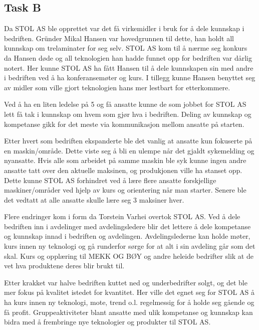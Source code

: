 \subsection{Task B}
Da STOL AS ble opprettet var det få virkemidler i bruk for å dele kunnskap i bedriften. 
Gründer Mikal Hansen var hovedgrunnen til dette, han holdt all kunnskap om trelaminater for seg selv. STOL AS kom til å nærme seg konkurs da Hansen døde og all teknologien han hadde funnet opp for bedriften var dårlig notert. 
Her kunne STOL AS ha fått Hansen til å dele kunnskapen sin med andre i bedriften ved å ha konferansemøter og kurs. I tillegg kunne Hansen benyttet seg av midler som ville gjort teknologien hans mer lestbart for etterkommere.

Ved å ha en liten ledelse på 5 og få ansatte kunne de som jobbet for STOL AS lett få tak i kunnskap om hvem som gjør hva i bedriften. Deling av kunnskap og kompetanse gikk for det meste via kommunikasjon mellom ansatte på starten.

Etter hvert som bedriften ekspanderte ble det vanlig at ansatte kun fokuserte på en maskin/område. Dette viste seg å bli en ulempe når det gjaldt sykemelding og nyansatte. 
Hvis alle som arbeidet på samme maskin ble syk kunne ingen andre ansatte tatt over den aktuelle maksinen, og produkjonen ville ha stanset opp. Dette kunne STOL AS forhindret ved å lære flere ansatte forskjellige maskiner/områder ved hjelp av kurs og orientering når man starter. Senere ble det vedtatt at alle ansatte skulle lære seg 3 maksiner hver. 

Flere endringer kom i form da Torstein Varhei overtok STOL AS. Ved å dele bedriften inn i avdelinger med avdelingsledere blir det lettere å dele kompetanse og kunnskap innad i bedriften og avdelingen. Avdelingslederne kan holde møter, kurs innen ny teknologi og gå runderfor sørge for at alt i sin avdeling går som det skal. Kurs og opplæring til MEKK OG BØY og andre heleide bedrifter slik at de vet hva produktene deres blir brukt til. 

Etter krakket var halve bedriften kuttet ned og underbedrifter solgt, og det ble mer fokus på kvalitet istedet for kvantitet. Her ville det egnet seg for STOL AS å ha kurs innen ny teknologi, mote, trend o.l. regelmessig for å holde seg gående og få profit. Gruppeaktiviteter blant ansatte med ulik kompetanse og kunnskap kan bidra med å frembringe nye teknologier og produkter til STOL AS.





